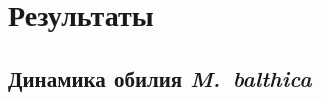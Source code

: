 \documentclass[12pt, a4paper]{article}
\begin{document}

\section{Результаты}
\subsection{Динамика обилия {\it M.~balthica}}
\end{document}
